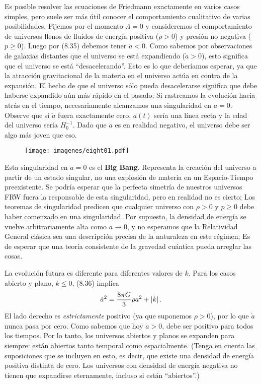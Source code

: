 \documentclass[11pt,b5paper,openany,twoside]{book}
\begin{document}
Es posible resolver las ecuaciones de Friedmann exactamente en varios casos simples, pero suele ser más útil conocer el comportamiento cualitativo de varias posibilidades.
Fijemos por el momento $\Lambda=0$ y consideremos el comportamiento de universos llenos de fluidos de energía positiva ($\rho > 0$) y presión no negativa ($p\geq 0$).
Luego por (8.35) debemos tener $\ddot a<0$.
Como sabemos por observaciones de galaxias distantes que el universo se está expandiendo ($\dot a>0$), esto significa que el universo se está ``desacelerando''.
Esto es lo que deberíamos esperar, ya que la atracción gravitacional de la materia en el universo actúa en contra de la expansión.
El hecho de que el universo sólo pueda desacelerarse significa que debe haberse expandido aún más rápido en el pasado; Si rastreamos la evolución hacia atrás en el tiempo, necesariamente alcanzamos una singularidad en $a=0$.
Observe que si $\ddot a$ fuera exactamente cero, $a(t)$ sería una línea recta y la edad del universo sería $H_0^{-1}$.
Dado que $\ddot a$ es en realidad negativo, el universo debe ser algo más joven que eso.

\begin{figure}[h]
\centering
\texttt{[image: imagenes/eight01.pdf]}
\end{figure}

Esta singularidad en $a=0$ es el {\bf Big Bang}.
Representa la creación del universo a partir de un estado singular, no una explosión de materia en un Espacio-Tiempo preexistente.
Se podría esperar que la perfecta simetría de nuestros universos FRW fuera la responsable de esta singularidad, pero en realidad no es cierto; Los teoremas de singularidad predicen que cualquier universo con $\rho>0$ y $p\geq 0$ debe haber comenzado en una singularidad.
Por supuesto, la densidad de energía se vuelve arbitrariamente alta como $a\rightarrow 0$, y no esperamos que la Relatividad General clásica sea una descripción precisa de la naturaleza en este régimen; Es de esperar que una teoría consistente de la gravedad cuántica pueda arreglar las cosas.

La evolución futura es diferente para diferentes valores de $k$.
Para los casos abierto y plano, $k\leq 0$, (8.36) implica
\begin{equation}
\dot a^2 = {{8\pi G}\over 3}\rho a^2 + |k|\,.\label{8.42}
\end{equation}
El lado derecho es {\it estrictamente} positivo (ya que suponemos $\rho>0$), por lo que $\dot a$ nunca pasa por cero.
Como sabemos que hoy $\dot a>0$, debe ser positivo para todos los tiempos.
Por lo tanto, los universos abiertos y planos se expanden para siempre: están abiertos tanto temporal como espacialmente.
(Tenga en cuenta las suposiciones que se incluyen en esto, es decir, que existe una densidad de energía positiva distinta de cero.
Los universos con densidad de energía negativa no tienen que expandirse eternamente, incluso si están ``abiertos''.)
\end{document}

